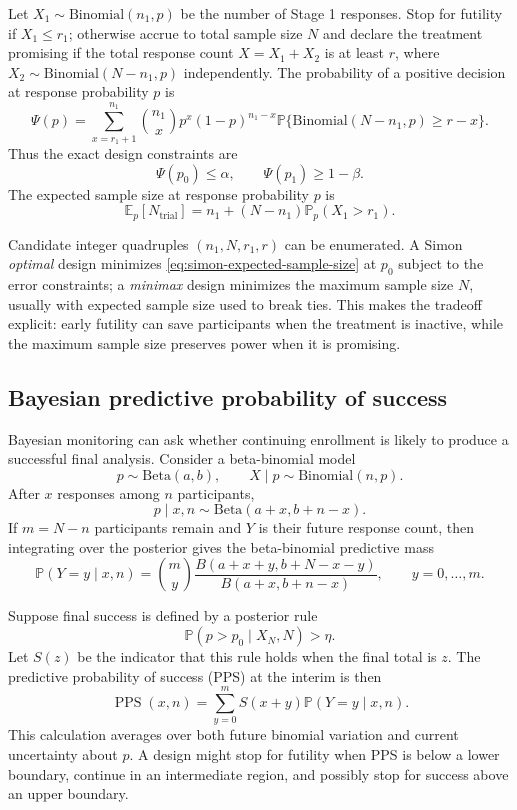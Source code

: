 \documentclass[12pt,oneside]{book}
\numberwithin{equation}{section}
\theoremstyle{definition}
\theoremstyle{plain}
\theoremstyle{remark}
\newcommand{\E}{\mathbb{E}}
\newcommand{\Prob}{\mathbb{P}}
\newcommand{\Bin}{\mathrm{Binomial}}
\newcommand{\BetaDist}{\mathrm{Beta}}
\begin{document}
Let $X_1\sim\Bin(n_1,p)$ be the number of Stage 1 responses.  Stop for futility
if $X_1\leq r_1$; otherwise accrue to total sample size $N$ and declare the
treatment promising if the total response count $X=X_1+X_2$ is at least $r$,
where $X_2\sim\Bin(N-n_1,p)$ independently.  The probability of a positive
decision at response probability $p$ is
\begin{equation}
 \Psi(p)=\sum_{x=r_1+1}^{n_1}
 \binom{n_1}{x}p^x(1-p)^{n_1-x}
 \Prob\{\Bin(N-n_1,p)\geq r-x\}.
 \label{eq:simon-positive-probability}
\end{equation}
Thus the exact design constraints are
\[
 \Psi(p_0)\leq\alpha,
 \qquad
 \Psi(p_1)\geq1-\beta.
\]
The expected sample size at response probability $p$ is
\begin{equation}
 \E_p[N_{\mathrm{trial}}]
 =n_1+(N-n_1)\Prob_p(X_1>r_1).
 \label{eq:simon-expected-sample-size}
\end{equation}

Candidate integer quadruples $(n_1,N,r_1,r)$ can be enumerated.  A Simon
\emph{optimal} design minimizes \eqref{eq:simon-expected-sample-size} at $p_0$
subject to the error constraints; a \emph{minimax} design minimizes the maximum
sample size $N$, usually with expected sample size used to break ties.  This
makes the tradeoff explicit: early futility can save participants when the
treatment is inactive, while the maximum sample size preserves power when it is
promising.

\subsection{Bayesian predictive probability of success}

Bayesian monitoring can ask whether continuing enrollment is likely to produce
a successful final analysis.  Consider a beta-binomial model
\[
 p\sim\BetaDist(a,b),
 \qquad X\mid p\sim\Bin(n,p).
\]
After $x$ responses among $n$ participants,
\[
 p\mid x,n\sim\BetaDist(a+x,b+n-x).
\]
If $m=N-n$ participants remain and $Y$ is their future response count, then
integrating over the posterior gives the beta-binomial predictive mass
\begin{equation}
 \Prob(Y=y\mid x,n)
 =\binom my
 \frac{B(a+x+y,b+N-x-y)}{B(a+x,b+n-x)},
 \qquad y=0,\ldots,m.
 \label{eq:beta-binomial-predictive}
\end{equation}

Suppose final success is defined by a posterior rule
\[
 \Prob(p>p_0\mid X_N,N)>\eta.
\]
Let $S(z)$ be the indicator that this rule holds when the final total is $z$.
The predictive probability of success (PPS) at the interim is then
\begin{equation}
 \operatorname{PPS}(x,n)
 =\sum_{y=0}^{m}S(x+y)\Prob(Y=y\mid x,n).
 \label{eq:predictive-probability-success}
\end{equation}
This calculation averages over both future binomial variation and current
uncertainty about $p$.  A design might stop for futility when PPS is below a
lower boundary, continue in an intermediate region, and possibly stop for
success above an upper boundary.
\end{document}
